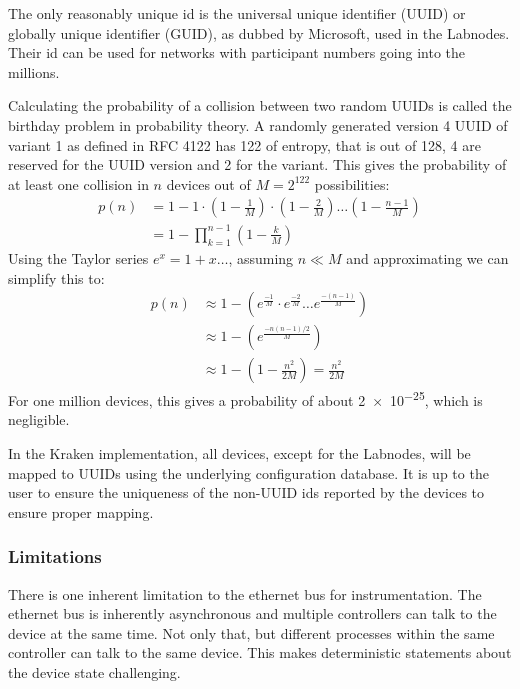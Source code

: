 The only reasonably unique id is the universal unique identifier (UUID) or globally unique identifier (GUID), as dubbed by Microsoft, used in the Labnodes. Their id can be used for networks with participant numbers going into the millions.

Calculating the probability of a collision between two random UUIDs is called the birthday problem \cite{BirthdayProblem} in probability theory. A randomly generated version 4 UUID of variant 1 as defined in RFC 4122 \cite{RFC-UUID} has \qty{122}{\bit} of entropy, that is out of \qty{128}{\bit}, \qty{4}{\bit} are reserved for the UUID version and \qty{2}{\bit} for the variant. This gives the probability of at least one collision in $n$ devices out of $M = 2^{122}$ possibilities:
\begin{align}
    p(n) &= 1 - 1 \cdot \left(1 - \frac{1}{M}\right) \cdot \left(1 - \frac{2}{M}\right) \dots \left(1 - \frac{n-1}{M}\right) \nonumber\\
    &= 1 - \prod_{k=1}^{n-1} \left(1 - \frac{k}{M} \right)
\end{align}
Using the Taylor series $e^x = 1+x \dots$, assuming $n \ll M$ and approximating we can simplify this to:
\begin{align}
    p(n) &\approx 1 - \left(e^\frac{-1}{M} \cdot e^\frac{-2}{M} \dots e^\frac{-(n-1)}{M} \right) \nonumber\\
    &\approx 1 - \left(e^\frac{-n(n-1)/2}{M} \right) \nonumber\\
    &\approx 1 - \left(1 - \frac{n^2}{2 M} \right) = \frac{n^2}{2 M}
\end{align}
For one million devices, this gives a probability of about \num{2e-25}, which is negligible.

In the Kraken implementation, all devices, except for the Labnodes, will be mapped to UUIDs using the underlying configuration database. It is up to the user to ensure the uniqueness of the non-UUID ids reported by the devices to ensure proper mapping.


\subsubsection{Limitations} %
There is one inherent limitation to the ethernet bus for instrumentation. The ethernet bus is inherently asynchronous and multiple controllers can talk to the device at the same time. Not only that, but different processes within the same controller can talk to the same device. This makes deterministic statements about the device state challenging.


